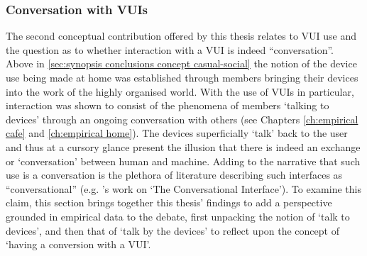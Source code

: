 \begin{corrections}
\subsubsection{Conversation with VUIs}\label{sec:synopsis conclusions concept vui}
The second conceptual contribution offered by this thesis relates to \ac{VUI} use and the question as to whether interaction with a VUI is indeed ``conversation''.
Above in \ref{sec:synopsis conclusions concept casual-social} the notion of the device use being made at home was established through members bringing their devices into the work of the highly organised world.
With the use of \acp{VUI} in particular, interaction was shown to consist of the phenomena of members `talking to devices' through an ongoing conversation with others (see Chapters \ref{ch:empirical cafe} and \ref{ch:empirical home}).
The devices superficially `talk' back to the user and thus at a cursory glance present the illusion that there is indeed an exchange or `conversation' between human and machine.
Adding to the narrative that such use is a conversation is the plethora of literature describing such interfaces as ``conversational'' (e.g. \citet{McTear2016}'s work on `The Conversational Interface').
To examine this claim, this section brings together this thesis' findings to add a perspective grounded in empirical data to the debate, first unpacking the notion of `talk to devices', and then that of `talk by the devices' to reflect upon the concept of `having a conversion with a \ac{VUI}'.


\end{corrections}
